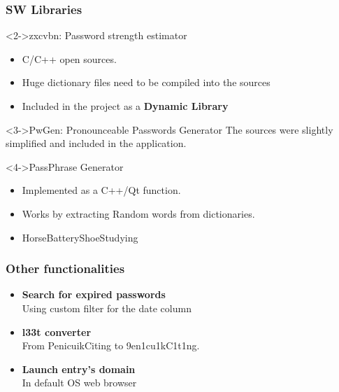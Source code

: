 \documentclass[14pt,usenames,dvipsnames]{beamer}
\begin{document}
\begin{frame}
  \frametitle{SW Libraries}

	  \begin{block}<2->{zxcvbn: Password strength estimator}
		\begin{itemize}
		\setlength\itemsep{0pt}
			\item C/C++ open sources.
			\item Huge dictionary files need to be compiled into the sources
			\item Included in the project as a \textbf{\color{NavyBlue} Dynamic Library}
		\end{itemize}
	\end{block}


	\begin{block}<3->{PwGen: Pronounceable Passwords Generator}
    The sources were slightly simplified and included in the application.
  \end{block}


	\begin{block}<4->{PassPhrase Generator}
		\begin{itemize}
				\setlength\itemsep{0pt}
		  \item Implemented as a C++/Qt function.
		  \item Works by extracting Random words from dictionaries.
		  \item {\color{NavyBlue} HorseBatteryShoeStudying}
		\end{itemize}
  \end{block}
\end{frame}

\begin{frame}
	\frametitle{Other functionalities}
  \begin{itemize}
  	\setlength\itemsep{25pt}
    \item<2-> \textbf{Search for expired passwords} \\
    Using custom filter for the date column 

    \item<3-> \textbf{l33t converter} \\
    From {\color{NavyBlue} PenicuikCiting} to {\color{NavyBlue} 9en1cu1kC1t1ng}.

    \item<4-> \textbf{Launch entry's domain} \\
    In default OS web browser

  \end{itemize}  	
	
\end{frame}
\end{document}
